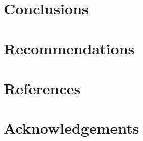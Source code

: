 \documentclass[pdftex,12pt,a4paper]{article}
\begin{document}

\pagebreak
\section {Conclusions}

\pagebreak
\section {Recommendations}


\pagebreak
\section {References}

\pagebreak
\section {Acknowledgements}

\end{document}
